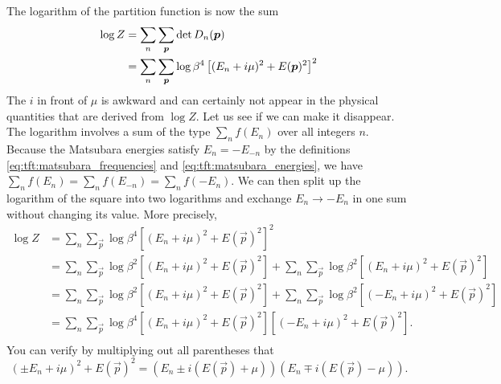 The logarithm of the partition function is now the sum
\begin{equation}
\begin{split}
	\log Z & = \sum_n \sum_{\bm{p}} \operatorname{det} D_n({\bm{p}}) \\
	       & = \sum_n \sum_{\bm{p}} \log \beta^4 \left[ (E_n + i \mu)^2 + E({\bm{p}})^2 \right]^2 \\
\end{split}
\end{equation}
The $i$ in front of $\mu$ is awkward and can certainly not appear in the physical quantities that are derived from $\log Z$.
Let us see if we can make it disappear.
The logarithm involves a sum of the type $\sum_n f(E_n)$ over all integers $n$.
Because the Matsubara energies satisfy $E_n = -E_{-n}$ by the definitions \eqref{eq:tft:matsubara_frequencies} and \eqref{eq:tft:matsubara_energies}, we have
$\sum_n f(E_n) = \sum_n f(E_{-n}) = \sum_n f(-E_n)$.
We can then split up the logarithm of the square into two logarithms and exchange $E_n \rightarrow -E_n$ in one sum without changing its value.
More precisely,
\begin{equation}
\begin{split}
	\log Z & = \sum_n \sum_\vec{p} \log \beta^4 \left[ (E_n + i \mu)^2 + E(\vec{p})^2 \right]^2 \\
	       & = \sum_n \sum_\vec{p} \log \beta^2 \left[ (E_n + i \mu)^2 + E(\vec{p})^2 \right] 
	         + \sum_n \sum_\vec{p} \log \beta^2 \left[ (E_n + i \mu)^2 + E(\vec{p})^2 \right] \\
	       & = \sum_n \sum_\vec{p} \log \beta^2 \left[ (E_n + i \mu)^2 + E(\vec{p})^2 \right]
	         + \sum_n \sum_\vec{p} \log \beta^2 \left[ (-E_n + i \mu)^2 + E(\vec{p})^2 \right] \\
	       & = \sum_n \sum_\vec{p} \log \beta^4 \left[ (E_n + i \mu)^2 + E(\vec{p})^2 \right] 
	                                            \left[ (-E_n + i \mu)^2 + E(\vec{p})^2 \right] . \\
\end{split}
\label{eq:tft:dirac_partition_function_splitting}
\end{equation}
You can verify by multiplying out all parentheses that
\begin{equation}
	(\pm E_n + i \mu)^2 + E(\vec{p})^2 = (E_n \pm i (E(\vec{p}) + \mu)) (E_n \mp i(E(\vec{p}) - \mu)) .
\end{equation}
